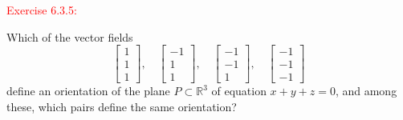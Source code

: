\documentclass[12pt]{article}
\begin{document}
{\newpage

\textcolor{red}{Exercise 6.3.5:}

Which of the vector fields
\begin{equation*}
    \begin{bmatrix}
    1\\1\\1
    \end{bmatrix}, \quad
      \begin{bmatrix}
   - 1\\1\\1
    \end{bmatrix}, \quad
      \begin{bmatrix}
   - 1\\-1\\1
    \end{bmatrix}, \quad
      \begin{bmatrix}
    -1\\-1\\-1
    \end{bmatrix}
\end{equation*}
define an orientation of the plane $P\subset \mathbb{R}^3$ of equation
$x+y+z=0$, and among these, which pairs define the same orientation?\medskip
\smallskip

}
\end{document}
